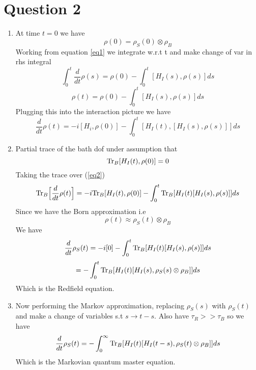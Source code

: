 \documentclass[12pt]{article}
\newcommand{\Tr}{{\rm Tr}}
\begin{document}
\section{Question 2}
\begin{enumerate}
    \item At time $t=0$ we have 
    $$ \rho (0) = \rho_S (0) \otimes \rho_B $$
    Working from equation \ref{eq1} we integrate w.r.t t and make change of var in rhs integral 
    $$ \int_0^t \frac{d}{dt} \rho (s) = \rho (0) - \int_0^t [ H_I (s), \rho (s)  ] ds $$
    $$ \rho (t) = \rho (0) - \int_0^t [H_I (s), \rho(s) ] ds $$
    Plugging this into the interaction picture we have 
    \begin{equation} \label{eq2}
         \frac{d}{dt} \rho (t) = -i[H_i, \rho (0) ] - \int_0^t [ H_I (t), [H_I (s), \rho (s) ]] ds 
    \end{equation}

    \item Partial trace of the bath dof under assumption that 
    $$ \Tr_B [H_I (t), \rho (0) ] = 0 $$
    Taking the trace over (\ref{eq2}) 
    $$ \Tr_B \Big[ \frac{d}{dt} \rho (t) \Big] = -i \Tr_B [ H_I (t), \rho (0) ] - \int_0^t \Tr_B [ H_I (t) [H_I (s), \rho (s) ]] ds $$
    Since we have the Born approximation i.e 
    $$ \rho (t) \approx \rho_S (t) \otimes \rho_B $$
    We have 
    $$ \frac{d}{dt} \rho_S (t) = -i [0] - \int_0^t \Tr_B [H_I (t) [H_I (s), \rho (s) ]] ds $$
    $$ = - \int_0^t \Tr_B [ H_I (t) [H_I (s), \rho_S (s) \otimes \rho_B ]] ds $$
    Which is the Redfield equation. 
    \item Now performing the Markov approximation, replacing $\rho_S (s)$ with $\rho_S (t)$ and make a change of variables s.t $s \rightarrow t-s$. Also have $\tau_R >> \tau_B$ so we have
    $$ \frac{d}{dt} \rho_S (t) = - \int_0^{\infty} \Tr_B [ H_I (t) [H_I (t-s), \rho_S (t) \otimes \rho_B]] ds $$
    Which is the Markovian quantum master equation. 

\end{enumerate}
\end{document}

